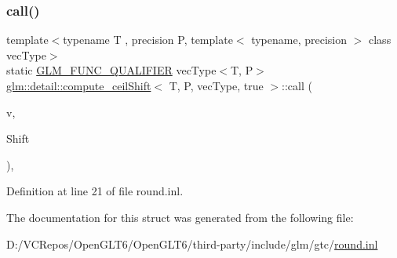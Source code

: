 \subsubsection{\texorpdfstring{call()}{call()}}
{\footnotesize\ttfamily template$<$typename T , precision P, template$<$ typename, precision $>$ class vec\+Type$>$ \\
static \mbox{\hyperlink{setup_8hpp_a33fdea6f91c5f834105f7415e2a64407}{G\+L\+M\+\_\+\+F\+U\+N\+C\+\_\+\+Q\+U\+A\+L\+I\+F\+I\+ER}} vec\+Type$<$T, P$>$ \mbox{\hyperlink{structglm_1_1detail_1_1compute__ceil_shift}{glm\+::detail\+::compute\+\_\+ceil\+Shift}}$<$ T, P, vec\+Type, true $>$\+::call (\begin{DoxyParamCaption}\item[{vec\+Type$<$ T, P $>$ const \&}]{v,  }\item[{T}]{Shift }\end{DoxyParamCaption})\hspace{0.3cm}{\ttfamily [inline]}, {\ttfamily [static]}}



Definition at line 21 of file round.\+inl.



The documentation for this struct was generated from the following file\+:\begin{DoxyCompactItemize}
\item 
D\+:/\+V\+C\+Repos/\+Open\+G\+L\+T6/\+Open\+G\+L\+T6/third-\/party/include/glm/gtc/\mbox{\hyperlink{round_8inl}{round.\+inl}}\end{DoxyCompactItemize}
